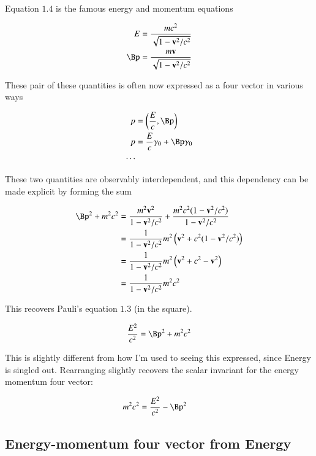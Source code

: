 Equation $1.4$ is the famous energy and momentum equations

\begin{align}\label{eqn:pauli_qm_relativity_intro:p1_4}
E &= \frac{ m c^2 }{\sqrt{1 - \Bv^2/c^2}} \\
\Bp &= \frac{ m \Bv }{\sqrt{1 - \Bv^2/c^2}} \\
\end{align}

These pair of these quantities is often now expressed as a four vector in various ways

\begin{align*}
p &= \left(\frac{E}{c}, \Bp \right) \\
p &= \frac{E}{c} \gamma_0 + \Bp \gamma_0 \\
\cdots
\end{align*}

These two quantities are observably interdependent, and this dependency can be made explicit by forming the sum

\begin{align*}
\Bp^2 + m^2 c^2 
&= \frac{ m^2 \Bv^2 }{{1 - \Bv^2/c^2}} +  \frac{ m^2 c^2( 1 - \Bv^2/c^2) }{{1 - \Bv^2/c^2}}  \\
&= \inv{1 - \Bv^2/c^2} m^2 \left( \Bv^2 + c^2( 1 - \Bv^2/c^2) \right) \\
&= \inv{1 - \Bv^2/c^2} m^2 \left( \Bv^2 + c^2 - \Bv^2 \right) \\
&= \inv{1 - \Bv^2/c^2} m^2 c^2 \\
\end{align*}

This recovers Pauli's equation $1.3$ (in the square).

\begin{align}\label{eqn:pauli_qm_relativity_intro:p1_3}
\frac{E^2}{c^2} = \Bp^2 + m^2 c^2 
\end{align}

This is slightly different from how I'm used to seeing this expressed, since Energy is singled out.
Rearranging slightly recovers the scalar invariant for the energy momentum four vector:

\begin{align*}
m^2 c^2 &= \frac{E^2}{c^2} -\Bp^2 
\end{align*}

\subsection{Energy-momentum four vector from Energy }

